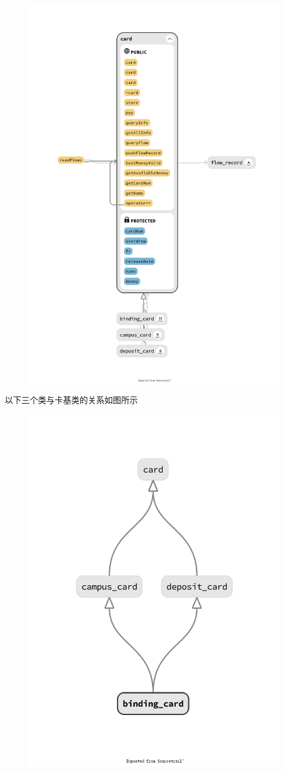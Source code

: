 \documentclass[11pt,UTF8]{ctexart}
\begin{document}
\begin{figure}[H]
\centering
\includegraphics[width=0.8\linewidth]{pic/card_class.png}
\end{figure}
\par 以下三个类与卡基类的关系如图所示
\begin{figure}[H]
\centering
\includegraphics[width=0.4\linewidth]{pic/diamond.png}
\end{figure}
\end{document}
